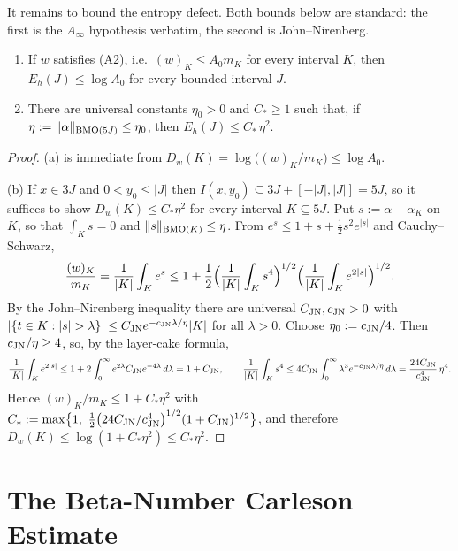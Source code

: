 It remains to bound the entropy defect. Both bounds below are standard: the
first is the $A_\infty$ hypothesis verbatim, the second is John--Nirenberg.

\begin{lemma}\label{lem:E-bounds}
	\leanok
	\begin{enumerate}
		\item[\rm(a)] If $w$ satisfies {\rm(A2)}, i.e.\ $(w)_K\le A_0m_K$ for every
		interval $K$, then $E_h(J)\le\log A_0$ for every bounded interval $J$.
		\item[\rm(b)] There are universal constants $\eta_0>0$ and
		$C_\ast\ge1$ such that, if $\eta:=\|\alpha\|_{\mathrm{BMO}(5J)}\le\eta_0$, then
		$E_h(J)\le C_\ast\,\eta^2$.
	\end{enumerate}
\end{lemma}

\begin{proof}
	(a) is immediate from $D_w(K)=\log\bigl((w)_K/m_K\bigr)\le\log A_0$.
	
	(b) If $x\in3J$ and $0<y_0\le|J|$ then $I(x,y_0)\subseteq3J+[-|J|,|J|]=5J$, so
	it suffices to show $D_w(K)\le C_\ast\eta^2$ for every interval $K\subseteq5J$.
	Put $s:=\alpha-\alpha_K$ on $K$, so that $\int_Ks=0$ and
	$\|s\|_{\mathrm{BMO}(K)}\le\eta$. From $e^s\le1+s+\tfrac12s^2e^{|s|}$ and
	Cauchy--Schwarz,
	\[
	\frac{(w)_K}{m_K}=\frac1{|K|}\int_Ke^{s}
	\le1+\frac12\Bigl(\frac1{|K|}\int_Ks^4\Bigr)^{1/2}
	\Bigl(\frac1{|K|}\int_Ke^{2|s|}\Bigr)^{1/2}.
	\]
	By the John--Nirenberg inequality there are universal $C_{\rm JN},c_{\rm JN}>0$
	with $|\{t\in K:|s|>\lambda\}|\le C_{\rm JN}e^{-c_{\rm JN}\lambda/\eta}|K|$ for
	all $\lambda>0$. Choose $\eta_0:=c_{\rm JN}/4$. Then $c_{\rm JN}/\eta\ge4$, so,
	by the layer-cake formula,
	\[
	\frac1{|K|}\int_Ke^{2|s|}
	\le1+2\int_0^\infty e^{2\lambda}C_{\rm JN}e^{-4\lambda}\,d\lambda
	=1+C_{\rm JN},
	\qquad
	\frac1{|K|}\int_Ks^4
	\le4C_{\rm JN}\int_0^\infty\lambda^3e^{-c_{\rm JN}\lambda/\eta}\,d\lambda
	=\frac{24C_{\rm JN}}{c_{\rm JN}^4}\,\eta^4 .
	\]
	Hence $(w)_K/m_K\le1+C_\ast\eta^2$ with
	$C_\ast:=\max\bigl\{1,\ \tfrac12\bigl(24C_{\rm JN}/c_{\rm JN}^4\bigr)^{1/2}
	(1+C_{\rm JN})^{1/2}\bigr\}$, and therefore
	$D_w(K)\le\log(1+C_\ast\eta^2)\le C_\ast\eta^2$.
\end{proof}

\section{The Beta-Number Carleson Estimate}\label{sec:beta-carl}

